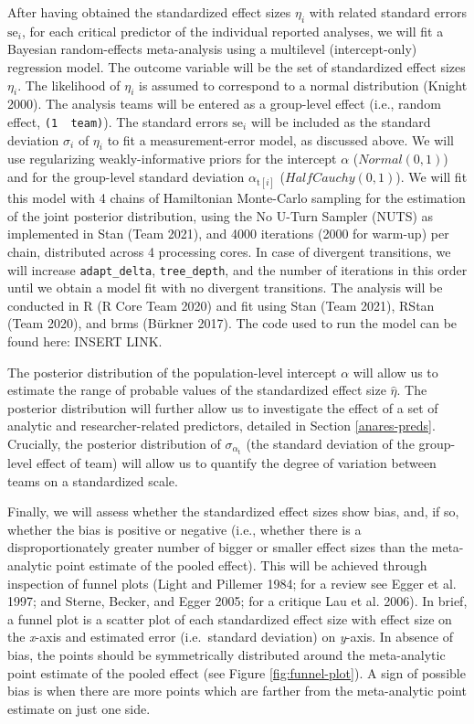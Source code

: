 \documentclass[
  12pt,
]{article}
\begin{document}
After having obtained the standardized effect sizes \(\eta_i\) with related standard errors \(\text{se}_i\), for each critical predictor of the individual reported analyses, we will fit a Bayesian random-effects meta-analysis using a multilevel (intercept-only) regression model.
The outcome variable will be the set of standardized effect sizes \(\eta_i\).
The likelihood of \(\eta_i\) is assumed to correspond to a normal distribution (Knight 2000).
The analysis teams will be entered as a group-level effect (i.e., random effect, \texttt{(1\ \textbar{}\ team)}).
The standard errors \(\text{se}_i\) will be included as the standard deviation \(\sigma_i\) of \(\eta_i\) to fit a measurement-error model, as discussed above.
We will use regularizing weakly-informative priors for the intercept \(\alpha\) (\(Normal(0, 1)\)) and for the group-level standard deviation \(\alpha_{\text{t}[i]}\) (\(HalfCauchy(0, 1)\)).
We will fit this model with 4 chains of Hamiltonian Monte-Carlo sampling for the estimation of the joint posterior distribution, using the No U-Turn Sampler (NUTS) as implemented in Stan (Team 2021), and 4000 iterations (2000 for warm-up) per chain, distributed across 4 processing cores.
In case of divergent transitions, we will increase \texttt{adapt\_delta}, \texttt{tree\_depth}, and the number of iterations in this order until we obtain a model fit with no divergent transitions.
The analysis will be conducted in R (R Core Team 2020) and fit using Stan (Team 2021), RStan (Team 2020), and brms (Bürkner 2017).
The code used to run the model can be found here: INSERT LINK.

The posterior distribution of the population-level intercept \(\alpha\) will allow us to estimate the range of probable values of the standardized effect size \(\hat{\eta}\).
The posterior distribution will further allow us to investigate the effect of a set of analytic and researcher-related predictors, detailed in Section \ref{anares-preds}.
Crucially, the posterior distribution of \(\sigma_{\alpha_{\text{t}}}\) (the standard deviation of the group-level effect of team) will allow us to quantify the degree of variation between teams on a standardized scale.

Finally, we will assess whether the standardized effect sizes show bias, and, if so, whether the bias is positive or negative (i.e., whether there is a disproportionately greater number of bigger or smaller effect sizes than the meta-analytic point estimate of the pooled effect).
This will be achieved through inspection of funnel plots (Light and Pillemer 1984; for a review see Egger et al. 1997; and Sterne, Becker, and Egger 2005; for a critique Lau et al. 2006).
In brief, a funnel plot is a scatter plot of each standardized effect size with effect size on the \emph{x}-axis and estimated error (i.e.~standard deviation) on \emph{y}-axis.
In absence of bias, the points should be symmetrically distributed around the meta-analytic point estimate of the pooled effect (see Figure \ref{fig:funnel-plot}).
A sign of possible bias is when there are more points which are farther from the meta-analytic point estimate on just one side.
\end{document}

